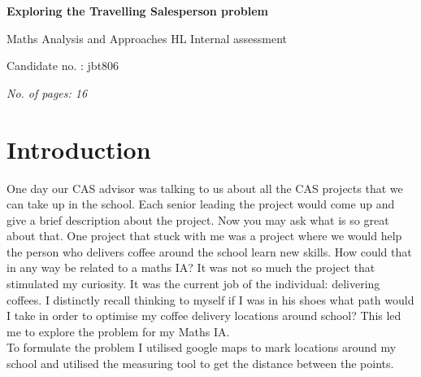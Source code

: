 \documentclass[a4paper]{article}
\date{\vspace{-5ex}}
\begin{document}
\begin{titlepage}
\centering
{\LARGE\bfseries Exploring the Travelling Salesperson problem}

\vspace{1cm}

{\Large Maths Analysis and Approaches HL Internal assessment}

\vspace{1cm}

{\large Candidate no. : jbt806}



\vfill

{\itshape No. of pages: 16}
\end{titlepage}
%
%

\section{Introduction}
One day our CAS advisor was talking to us about all the CAS projects that we can take up in the school. Each senior leading the project would come up and give a brief description about the project. Now you may ask what is so great about that. One project that stuck with me was a project where we would help the person who delivers coffee around the school learn new skills. How could that in any way be related to a maths IA? It was not so much the project that stimulated my curiosity. It was the current job of the individual: delivering coffees. I distinctly recall thinking to myself if I was in his shoes what path would I take in order to optimise my coffee delivery locations around school? This led me to explore the problem for my Maths IA. \\
To formulate the problem I utilised google maps to mark locations around my school and utilised the measuring tool to get the distance between the points.
\end{document}
